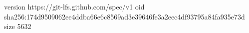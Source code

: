 version https://git-lfs.github.com/spec/v1
oid sha256:174d9509062ee4ddba66e6c8569ad3e39646fe3a2eec4df93795a84fa935e73d
size 5632
